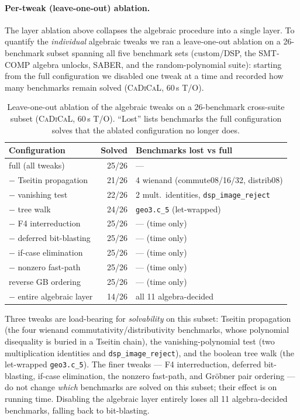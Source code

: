\documentclass[runningheads]{llncs}
\newcommand{\cadical}{\textsc{CaDiCaL}\xspace}
\begin{document}
\paragraph{Per-tweak (leave-one-out) ablation.}
The layer ablation above collapses the algebraic procedure into a
single layer. To quantify the \emph{individual} algebraic tweaks we
ran a leave-one-out ablation on a 26-benchmark subset spanning all
five benchmark sets (custom/DSP, the SMT-COMP algebra unlocks,
SABER, and the random-polynomial suite): starting from the full
configuration we disabled one tweak at a time and recorded how many
benchmarks remain solved (\cadical, 60\,s T/O).

\begin{table}[ht]
\caption{Leave-one-out ablation of the algebraic tweaks on a
26-benchmark cross-suite subset (\cadical, 60\,s T/O). ``Lost''
lists benchmarks the full configuration solves that the ablated
configuration no longer does.}
\label{tab:tweak-ablation}
\centering
\small
\begin{tabular}{lrl}
\toprule
Configuration & Solved & Benchmarks lost vs full \\
\midrule
full (all tweaks)        & 25/26 & --- \\
$-$ Tseitin propagation  & 21/26 & 4 wienand (commute08/16/32, distrib08) \\
$-$ vanishing test       & 22/26 & 2 mult.\ identities, \texttt{dsp\_image\_reject} \\
$-$ tree walk            & 24/26 & \texttt{geo3.c\_5} (let-wrapped) \\
$-$ F4 interreduction    & 25/26 & --- (time only) \\
$-$ deferred bit-blasting& 25/26 & --- (time only) \\
$-$ if-case elimination  & 25/26 & --- (time only) \\
$-$ nonzero fast-path    & 25/26 & --- (time only) \\
reverse GB ordering      & 25/26 & --- (time only) \\
$-$ entire algebraic layer & 14/26 & all 11 algebra-decided \\
\bottomrule
\end{tabular}
\end{table}

Three tweaks are load-bearing for \emph{solvability} on this
subset: Tseitin propagation (the four wienand
commutativity/distributivity benchmarks, whose polynomial
disequality is buried in a Tseitin chain), the
vanishing-polynomial test (two multiplication identities and
\texttt{dsp\_image\_reject}), and the boolean tree walk (the
let-wrapped \texttt{geo3.c\_5}). The finer tweaks --- F4
interreduction, deferred bit-blasting, if-case elimination, the
nonzero fast-path, and Gr\"obner pair ordering --- do not change
\emph{which} benchmarks are solved on this subset; their effect is
on running time. Disabling the algebraic layer entirely loses all
11 algebra-decided benchmarks, falling back to bit-blasting.
\end{document}
